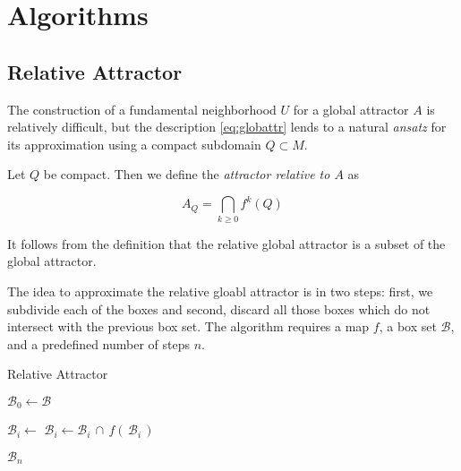 \section{Algorithms}


\subsection{Relative Attractor}

The construction of a fundamental neighborhood $U$ for a global attractor $A$ is
relatively difficult, but the description \autoref{eq:globattr} lends to 
a natural \emph{ansatz} for its approximation using a compact subdomain $Q \subset M$. \\

\begin{definition}
    Let $Q$ be compact. Then we define the \emph{attractor relative to $A$} as

    \begin{equation}
        A_Q = \bigcap\limits_{k \geq 0} f^k (Q)
    \end{equation}

\end{definition}

\begin{remark}
    It follows from the definition that the relative global attractor is a subset of the 
    global attractor.\\
\end{remark}

The idea to approximate the relative gloabl attractor is in two steps: first, we subdivide 
each of the boxes and second, discard all those boxes which do not intersect with the 
previous box set. The algorithm requires a map $f$, a box set $\mathcal{B}$, and a 
predefined number of steps $n$. 

\begin{algorithm}
    \caption{Relative Attractor}
    \label{alg:relativeattractor}

    \begin{algorithmic}[1]
        \State $\mathcal{B}_0 \gets \mathcal{B}$

            \State $\mathcal{B}_i \gets$ 
            \State $\mathcal{B}_i \gets \mathcal{B}_i\, \cap\, f (\,\mathcal{B}_i\,)$
        \EndFor

        \State \Return $\mathcal{B}_n$ 
    \end{algorithmic}
\end{algorithm}

